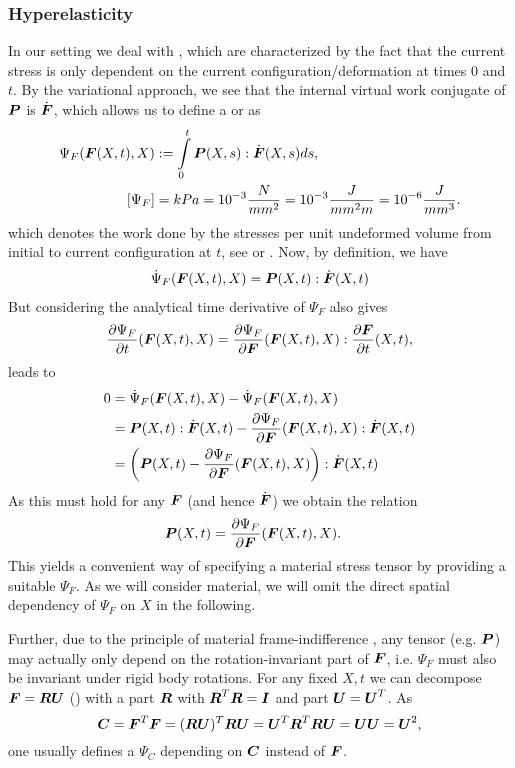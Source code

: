 \subsubsection{Hyperelasticity}
In our setting we deal with , which are characterized by the fact that the current stress is only dependent on the
current configuration/deformation at times $0$ and $t$.
By the variational approach, we see that the internal virtual work conjugate of $\boldsymbol{P}$ is $\dot{\boldsymbol{F}}$,
which allows us to define a  or  as
\begin{align*}
	\Psi_F(\boldsymbol{F}(X,t),X) &:= \int\limits_{0}^{t}\boldsymbol{P}(X,s):\dot{\boldsymbol{F}}(X,s)ds,\\
	[\Psi_F] &= kPa = 10^{-3}\frac{N}{mm^2} = 10^{-3}\frac{J}{mm^2 m} = 10^{-6}\frac{J}{mm^3}.
\end{align*}
which denotes the work done by the stresses per unit undeformed volume from initial to current configuration at $t$,
see \cite[p.156]{Bonet2008} or \cite[p.207]{Holzapfel2000}.
Now, by definition, we have
\begin{align}
	\dot{\Psi}_F(\boldsymbol{F}(X,t),X) = \boldsymbol{P}(X,t):\dot{\boldsymbol{F}}(X,t)\label{eq:psif_dt1}
\end{align}
But considering the analytical time derivative of $\Psi_F$ also gives 
\begin{align}
	\frac{\partial \Psi_F}{\partial t}(\boldsymbol{F}(X,t),X) = \frac{\partial \Psi_F}{\partial \boldsymbol{F}}(\boldsymbol{F}(X,t),X):\frac{\partial \boldsymbol{F}}{\partial t}(X,t),\label{eq:psif_dt2} 
\end{align}
leads to
\begin{align*}
	0 &= \dot{\Psi}_F(\boldsymbol{F}(X,t),X) - \dot{\Psi}_F(\boldsymbol{F}(X,t),X)\\
	 &= \boldsymbol{P}(X,t):\dot{\boldsymbol{F}}(X,t) - \frac{\partial \Psi_F}{\partial \boldsymbol{F}}(\boldsymbol{F}(X,t),X):\dot{\boldsymbol{F}}(X,t)\\
	 &= \left(\boldsymbol{P}(X,t) - \frac{\partial \Psi_F}{\partial \boldsymbol{F}}(\boldsymbol{F}(X,t),X)\right):\dot{\boldsymbol{F}}(X,t)
\end{align*}
As this must hold for any $\boldsymbol{F}$ (and hence $\dot{\boldsymbol{F}}$) we obtain the relation
\begin{align}
	\boldsymbol{P}(X,t) &= \frac{\partial \Psi_F}{\partial \boldsymbol{F}}(\boldsymbol{F}(X,t),X).
\end{align}
This yields a convenient way of specifying a material stress tensor by providing a suitable $\Psi_F$.
As we will consider  material, we will omit the direct spatial dependency of $\Psi_F$ on $X$ in the following.

Further, due to the principle of material frame-indifference \cite[p.198]{Holzapfel2000}, any tensor (e.g. $\boldsymbol{P}$)
may actually only depend on the rotation-invariant part of $\boldsymbol{F}$, i.e. $\Psi_F$ must also be invariant under rigid body rotations.
For any fixed $X,t$ we can decompose $\boldsymbol{F} = \boldsymbol{R}\boldsymbol{U}$ (\cite[p.85]{Holzapfel2000}) with a
 part $\boldsymbol{R}$ with $\boldsymbol{R}^T\boldsymbol{R} = \boldsymbol{I}$ and  part $\boldsymbol{U} = \boldsymbol{U}^T$.
As
\[
	\boldsymbol{C} = \boldsymbol{F}^T\boldsymbol{F} = (\boldsymbol{R}\boldsymbol{U})^T\boldsymbol{R}\boldsymbol{U} = \boldsymbol{U}^T\boldsymbol{R}^T\boldsymbol{R}\boldsymbol{U} = \boldsymbol{U}\boldsymbol{U} = \boldsymbol{U}^2, 
\]
one usually defines a $\Psi_C$ depending on $\boldsymbol{C}$ instead of $\boldsymbol{F}$.

